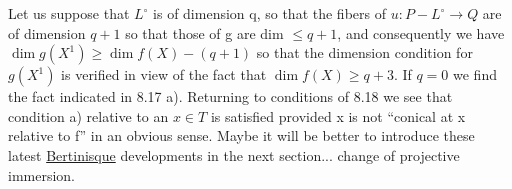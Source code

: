 
Let us suppose that $L^{\circ}$ is of dimension q, so that the fibers
of $u\colon P - L^{\circ} \to Q$ are of dimension $q + 1$ so that those of g are dim
$\leq q + 1$, and consequently we have $\dim g(X^{1}) \geq \dim f(X) - (q + 1)$ so
that the dimension condition for $g(X^{1})$ is verified in view of the
fact that $\dim f(X) \geq q + 3$. If $q = 0$ we find the fact indicated
in 8.17 a). Returning to conditions of 8.18 we see that condition
a) relative to an $x \in T$ is satisfied provided x is not ``conical at
x relative to f'' in an obvious sense. Maybe it will be better to
introduce these latest \uline{Bertinisque} developments in the next
section... change of projective immersion.
